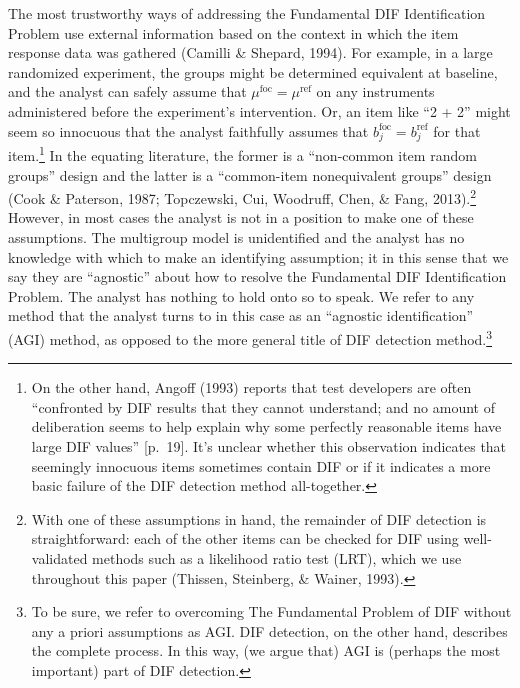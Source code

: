 \documentclass[
  english,
  man,floatsintext]{apa6}
\begin{document}
The most trustworthy ways of addressing the Fundamental DIF Identification Problem use external information based on the context in which the item response data was gathered (Camilli \& Shepard, 1994). For example, in a large randomized experiment, the groups might be determined equivalent at baseline, and the analyst can safely assume that \(\mu^{\text{foc}} = \mu^{\text{ref}}\) on any instruments administered before the experiment's intervention. Or, an item like ``2 + 2'' might seem so innocuous that the analyst faithfully assumes that \(b_j^{\text{foc}} = b_j^{\text{ref}}\) for that item.\footnote{On the other hand, Angoff (1993) reports that test developers are often ``confronted by DIF results that they cannot understand; and no amount of deliberation seems to help explain why some perfectly reasonable items have large DIF values'' {[}p.~19{]}. It's unclear whether this observation indicates that seemingly innocuous items sometimes contain DIF or if it indicates a more basic failure of the DIF detection method all-together.} In the equating literature, the former is a ``non-common item random groups'' design and the latter is a ``common-item nonequivalent groups'' design (Cook \& Paterson, 1987; Topczewski, Cui, Woodruff, Chen, \& Fang, 2013).\footnote{With one of these assumptions in hand, the remainder of DIF detection is straightforward: each of the other items can be checked for DIF using well-validated methods such as a likelihood ratio test (LRT), which we use throughout this paper (Thissen, Steinberg, \& Wainer, 1993).} However, in most cases the analyst is not in a position to make one of these assumptions. The multigroup model is unidentified and the analyst has no knowledge with which to make an identifying assumption; it in this sense that we say they are ``agnostic'' about how to resolve the Fundamental DIF Identification Problem. The analyst has nothing to hold onto so to speak. We refer to any method that the analyst turns to in this case as an ``agnostic identification'' (AGI) method, as opposed to the more general title of DIF detection method.\footnote{To be sure, we refer to overcoming The Fundamental Problem of DIF without any a priori assumptions as AGI. DIF detection, on the other hand, describes the complete process. In this way, (we argue that) AGI is (perhaps the most important) part of DIF detection.}
\end{document}
